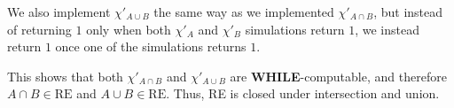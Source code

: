 We also implement $\chi'_{A \cup B}$ the same way as we implemented $\chi'_{A \cap B}$, but instead of returning $1$ only when both $\chi'_A$ and $\chi'_B$ simulations return $1$, we instead return $1$ once one of the simulations returns $1$.

\bigskip

This shows that both $\chi'_{A \cap B}$ and $\chi'_{A \cup B}$ are \textbf{WHILE}-computable, and therefore $A \cap B \in \text{RE}$ and $A \cup B \in \text{RE}$.  
Thus, RE is closed under intersection and union.


